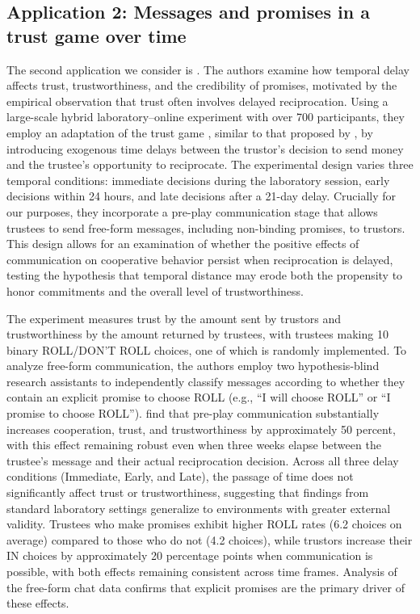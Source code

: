\documentclass[11pt]{article}
\begin{document}
\begin{sloppypar}


 
\subsection{Application 2: Messages and promises in a trust game over time 
\citep{ederer_schneider_2022}}

The second application we consider is \citet{ederer_schneider_2022}. The authors examine how temporal delay affects trust, trustworthiness, and the credibility of promises, motivated by the empirical observation that trust often involves delayed reciprocation. Using a large-scale hybrid laboratory–online experiment with over 700 participants, they employ an adaptation of the trust game \citep{berg1995trust, guth1997cooperation}, similar to that proposed by \citet{charness2006promises}, by introducing exogenous time delays between the trustor's decision to send money and the trustee's opportunity to reciprocate. The experimental design varies three temporal conditions: immediate decisions during the laboratory session, early decisions within 24 hours, and late decisions after a 21-day delay. Crucially for our purposes, they incorporate a pre-play communication stage that allows trustees to send free-form messages, including non-binding promises, to trustors. This design allows for an examination of whether the positive effects of communication on cooperative behavior persist when reciprocation is delayed, testing the hypothesis that temporal distance may erode both the propensity to honor commitments and the overall level of trustworthiness.

The experiment measures trust by the amount sent by trustors and trustworthiness by the amount returned by trustees, with trustees making 10 binary ROLL/DON’T ROLL choices, one of which is randomly implemented. To analyze free-form communication, the authors employ two hypothesis-blind research assistants to independently classify messages according to whether they contain an explicit promise to choose ROLL (e.g., “I will choose ROLL” or “I promise to choose ROLL”). \citet{ederer_schneider_2022} find that pre-play communication substantially increases cooperation, trust, and trustworthiness by approximately 50 percent, with this effect remaining robust even when three weeks elapse between the trustee's message and their actual reciprocation decision. Across all three delay conditions (Immediate, Early, and Late), the passage of time does not significantly affect trust or trustworthiness, suggesting that findings from standard laboratory settings generalize to environments with greater external validity. Trustees who make promises exhibit higher ROLL rates (6.2 choices on average) compared to those who do not (4.2 choices), while trustors increase their IN choices by approximately 20 percentage points when communication is possible, with both effects remaining consistent across time frames. Analysis of the free-form chat data confirms that explicit promises are the primary driver of these effects.



\end{sloppypar}
\end{document}

